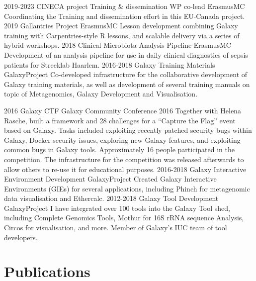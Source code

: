 \documentclass[]{shiltemann-cv}
\begin{document}
\begin{entrylist}
   \entry
    {2019-2023}
    {CINECA project Training \& dissemination WP co-lead}
    {ErasmusMC}
    {Coordinating the Training and dissemination effort in this EU-Canada project.}
   \entry
    {2019}
    {Gallantries Project}
    {ErasmusMC}
    {Lesson development combining Galaxy training with Carpentries-style R lessons, and scalable delivery via a series of hybrid workshops.}
  \entry
    {2018}
    {Clinical Microbiota Analysis Pipeline}
    {ErasmusMC}
    {Development of an analysis pipeline for use in daily clinical diagnostics of sepsis patients for Streeklab Haarlem.}
  \entry
    {2016-2018}
    {Galaxy Training Materials}
    {GalaxyProject}
    {Co-developed infrastructure for the collaborative development of Galaxy training materials, as well as development of several training manuals on topic of Metagenomics, Galaxy Development and Visualisation.  }


  \entry
    {2016}
    {Galaxy CTF}
    {Galaxy Community Conference 2016}
    {Together with Helena Rasche, built a framework and 28 challenges for a “Capture the Flag” event based on Galaxy. Tasks included exploiting recently patched security bugs within Galaxy, Docker security issues, exploring new Galaxy features, and exploiting common bugs in Galaxy tools. Approximately 16 people participated in the competition. The infrastructure for the competition was released afterwards to allow others to re-use it for educational purposes.}
   \entry
     {2016-2018}
     {Galaxy Interactive Environment Development}
     {GalaxyProject}
     {Created Galaxy Interactive Environments (GIEs) for several applications, including Phinch for metagenomic data visualisation and Ethercalc.}
   \entry
    {2012-2018}
    {Galaxy Tool Development}
    {GalaxyProject}
    {I have integrated over 100 tools into the Galaxy Tool shed, including Complete Genomics Tools, Mothur for 16S rRNA sequence Analysis, Circos for visualisation, and more. Member of Galaxy's IUC team of tool developers.}
\end{entrylist}

\section{Publications}

\nocite{*} %
\printbibliography[title={~}]
\end{document}
